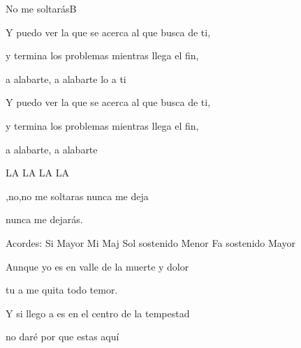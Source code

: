 \documentclass[12pt, spanish]{book}
\begin{document}
\begin{song}{No me soltarás}{B}
        \begin{SBOpGroup}
            Y puedo ver la  que se acerca al que busca de ti,

            y termina los problemas mientras llega el fin,

             a alabarte,  a alabarte lo a ti
        \end{SBOpGroup}

        \begin{SBOpGroup}
            Y puedo ver la  que se acerca al que busca de ti,

            y termina los problemas mientras llega el fin,

             a alabarte,  a alabarte
        \end{SBOpGroup}

        \begin{SBOpGroup}
             LA LA   LA LA

            ,no,no me soltaras  nunca me deja

             nunca me dejarás.
        \end{SBOpGroup}

        \ifChordBk
        \begin{SBOpGroup}
            Acordes:\break
            \upchord{\B}\qquad\qquad Si Mayor \hfill
            \upchord{\EMaj}\qquad Mi Maj \hfill\null\break
            \upchord{\Gsm}\qquad Sol sostenido Menor \hfill
            \upchord{\Fs}Fa sostenido Mayor \hfill\null\break
            \clearpage
        \end{SBOpGroup}
        \fi
        \begin{SBExtraKeys}{


            \begin{SBOpGroup}
                Aunque yo es en valle de la muerte y dolor

                tu a me quita todo temor.

                Y si llego a es en el centro de la tempestad

                no daré por que estas aquí
            \end{SBOpGroup}

}
\end{SBExtraKeys}
\end{song}
\end{document}
